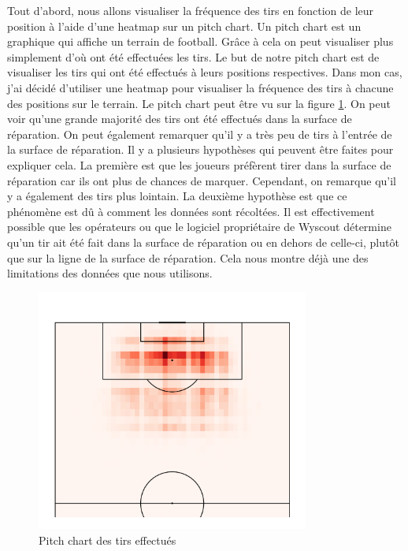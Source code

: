 \documentclass[12pt]{article}
\begin{document}
Tout d'abord, nous allons visualiser la fréquence des tirs en fonction de leur position à l'aide d'une heatmap sur un pitch chart.
Un pitch chart est un graphique qui affiche un terrain de football.
Grâce à cela on peut visualiser plus simplement d'où ont été effectuées les tirs.
Le but de notre pitch chart est de visualiser les tirs qui ont été effectués à leurs positions respectives.
Dans mon cas, j'ai décidé d'utiliser une heatmap pour visualiser la fréquence des tirs à chacune des positions sur le terrain.
Le pitch chart peut être vu sur la figure \ref{fig:pitch_chart}.
On peut voir qu'une grande majorité des tirs ont été effectués dans la surface de réparation.
On peut également remarquer qu'il y a très peu de tirs à l'entrée de la surface de réparation.
Il y a plusieurs hypothèses qui peuvent être faites pour expliquer cela.
La première est que les joueurs préfèrent tirer dans la surface de réparation car ils ont plus de chances de marquer. 
Cependant, on remarque qu'il y a également des tirs plus lointain.
La deuxième hypothèse est que ce phénomène est dû à comment les données sont récoltées.
Il est effectivement possible que les opérateurs ou que le logiciel propriétaire de Wyscout détermine qu'un tir ait été fait dans la surface de réparation ou en dehors de celle-ci, plutôt que sur la ligne de la surface de réparation.
Cela nous montre déjà une des limitations des données que nous utilisons.
\begin{figure}[htp]
    \centering
    \includegraphics[width=0.8\textwidth]{img/pitchChartFrequency.png}
    \caption{Pitch chart des tirs effectués}
    \label{fig:pitch_chart}
\end{figure}
\end{document}

